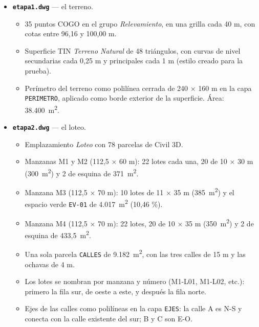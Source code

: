 \documentclass[12pt, a4paper]{article}
\begin{document}
\begin{itemize}[itemsep=8pt]
  \item \textbf{\texttt{etapa1.dwg}} --- el terreno.
  \begin{itemize}[itemsep=2pt]
    \item 35 puntos COGO en el grupo \textit{Relevamiento}, en una grilla cada 40 m, con
    cotas entre 96,16 y 100,00 m.
    \item Superficie TIN \textit{Terreno Natural} de 48 triángulos, con curvas de nivel
    secundarias cada 0,25 m y principales cada 1 m (estilo creado para la prueba).
    \item Perímetro del terreno como polilínea cerrada de 240 × 160 m en la capa
    \texttt{PERIMETRO}, aplicado como borde exterior de la superficie. Área:
    38.400~m\textsuperscript{2}.
  \end{itemize}

  \item \textbf{\texttt{etapa2.dwg}} --- el loteo.
  \begin{itemize}[itemsep=2pt]
    \item Emplazamiento \textit{Loteo} con 78 parcelas de Civil 3D.
    \item Manzanas M1 y M2 (112,5 × 60 m): 22 lotes cada una, 20 de 10 × 30 m
    (300~m\textsuperscript{2}) y 2 de esquina de 371~m\textsuperscript{2}.
    \item Manzana M3 (112,5 × 70 m): 10 lotes de 11 × 35 m (385~m\textsuperscript{2}) y el
    espacio verde \texttt{EV-01} de 4.017~m\textsuperscript{2} (10,46 \%).
    \item Manzana M4 (112,5 × 70 m): 22 lotes, 20 de 10 × 35 m (350~m\textsuperscript{2}) y
    2 de esquina de 433,5~m\textsuperscript{2}.
    \item Una sola parcela \texttt{CALLES} de 9.182~m\textsuperscript{2}, con las tres
    calles de 15 m y las ochavas de 4 m.
    \item Los lotes se nombran por manzana y número (M1-L01, M1-L02, etc.): primero la fila
    sur, de oeste a este, y después la fila norte.
    \item Ejes de las calles como polilíneas en la capa \texttt{EJES}: la calle A es N-S y
    conecta con la calle existente del sur; B y C son E-O.
  \end{itemize}


\end{itemize}
\end{document}
